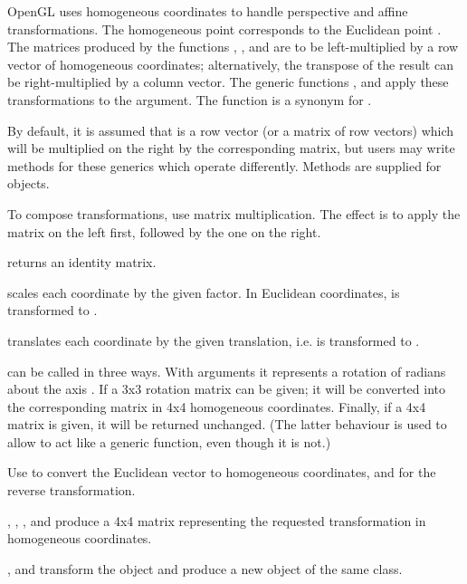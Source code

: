 \begin{Details}\relax
OpenGL uses homogeneous coordinates to handle perspective and affine
transformations.  The homogeneous point  corresponds
to the Euclidean point .  The matrices produced by
the functions , , and 
are to be left-multiplied by a row vector 
of homogeneous coordinates; alternatively, the transpose of the result
can be right-multiplied by a column vector.  The generic functions
,  and  apply these transformations
to the  argument.  The  function is a synonym 
for .

By default, it is assumed that  is a row vector
(or a matrix of row vectors) which will be multiplied on the right by
the corresponding matrix, but users may write methods for these generics
which operate differently.  Methods are supplied for 
objects.

To compose transformations, use matrix multiplication.  The effect is
to apply the matrix on the left first, followed by the one on the right.

 returns an identity matrix.

 scales each coordinate by the given factor.  In Euclidean
coordinates,  is transformed to .

 translates each coordinate by the given translation, i.e.
 is transformed to .

 can be called in three ways.  With 
arguments  it represents a rotation 
of  radians about the axis 
.  If a 3x3 rotation matrix can be given;
it will be converted into the corresponding matrix in 4x4 homogeneous
coordinates.  Finally, if a 4x4 matrix is given, it will be returned unchanged.
(The latter behaviour is used to allow  to act like a 
generic function, even though it is not.)

Use  to convert the Euclidean vector  to
homogeneous coordinates, and  for the reverse transformation.
\end{Details}
\begin{Value}
,
, , and  produce
a 4x4 matrix representing the requested transformation
in homogeneous coordinates.  

,  and  transform the object
and produce a new object of the same class.
\end{Value}
